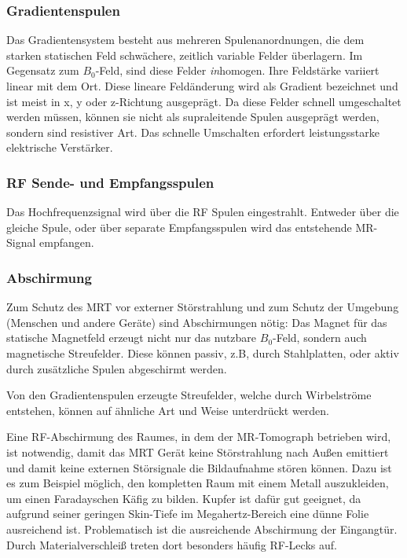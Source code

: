 \subsubsection{Gradientenspulen}
Das Gradientensystem besteht aus mehreren Spulenanordnungen, die dem starken statischen Feld schwächere, zeitlich variable Felder überlagern. Im Gegensatz zum $B_0$-Feld, sind diese Felder \textit{in}homogen. Ihre Feldstärke variiert linear mit dem Ort. Diese lineare Feldänderung wird als Gradient bezeichnet und ist meist in x, y oder z-Richtung ausgeprägt. Da diese Felder schnell umgeschaltet werden müssen, können sie nicht als supraleitende Spulen ausgeprägt werden, sondern sind resistiver Art. Das schnelle Umschalten erfordert leistungsstarke elektrische Verstärker.

\subsubsection{RF Sende- und Empfangsspulen}
Das Hochfrequenzsignal wird über die RF Spulen eingestrahlt. Entweder über die gleiche Spule, oder über separate Empfangsspulen wird das entstehende MR-Signal empfangen.

\subsubsection{Abschirmung}
Zum Schutz des MRT vor externer Störstrahlung und zum Schutz der Umgebung (Menschen und andere Geräte) sind Abschirmungen nötig:
Das Magnet für das statische Magnetfeld erzeugt nicht nur das nutzbare $B_0$-Feld, sondern auch magnetische Streufelder. Diese können passiv, z.B, durch Stahlplatten, oder aktiv durch zusätzliche Spulen abgeschirmt werden.

Von den Gradientenspulen erzeugte Streufelder, welche durch Wirbelströme entstehen, können auf ähnliche Art und Weise unterdrückt werden.

Eine RF-Abschirmung des Raumes, in dem der MR-Tomograph betrieben wird, ist notwendig, damit das MRT Gerät keine Störstrahlung nach Außen emittiert und damit keine externen Störsignale die Bildaufnahme stören können.
Dazu ist es zum Beispiel möglich, den kompletten Raum mit einem Metall auszukleiden, um einen Faradayschen Käfig zu bilden. Kupfer ist dafür gut geeignet, da aufgrund seiner geringen Skin-Tiefe im Megahertz-Bereich eine dünne Folie ausreichend ist. \cite{Weibler1993} Problematisch ist die ausreichende Abschirmung der Eingangtür. Durch Materialverschleiß treten dort besonders häufig RF-Lecks auf.


